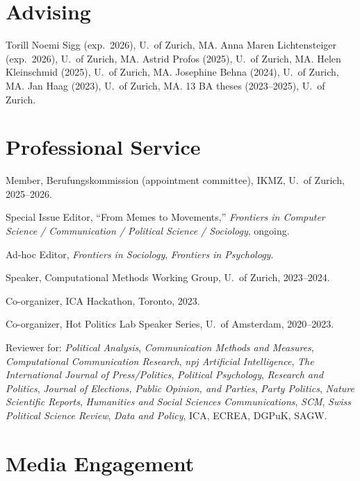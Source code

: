 \documentclass[11pt,a4paper]{article}
\begin{document}
\section{Advising}

Torill Noemi Sigg (exp.\ 2026), U.\ of Zurich, MA.
Anna Maren Lichtensteiger (exp.\ 2026), U.\ of Zurich, MA.
Astrid Profos (2025), U.\ of Zurich, MA.
Helen Kleinschmid (2025), U.\ of Zurich, MA.
Josephine Behna (2024), U.\ of Zurich, MA.
Jan Haag (2023), U.\ of Zurich, MA.
13 BA theses (2023--2025), U.\ of Zurich.


\section{Professional Service}

Member, Berufungskommission (appointment committee), IKMZ, U.\ of Zurich, 2025--2026.

Special Issue Editor, ``From Memes to Movements,'' \textit{Frontiers in Computer Science / Communication / Political Science / Sociology}, ongoing.

Ad-hoc Editor, \textit{Frontiers in Sociology}, \textit{Frontiers in Psychology}.

Speaker, Computational Methods Working Group, U.\ of Zurich, 2023--2024.

Co-organizer, ICA Hackathon, Toronto, 2023.

Co-organizer, Hot Politics Lab Speaker Series, U.\ of Amsterdam, 2020--2023.

Reviewer for: \textit{Political Analysis}, \textit{Communication Methods and Measures}, \textit{Computational Communication Research}, \textit{npj Artificial Intelligence}, \textit{The International Journal of Press/Politics}, \textit{Political Psychology}, \textit{Research and Politics}, \textit{Journal of Elections, Public Opinion, and Parties}, \textit{Party Politics}, \textit{Nature Scientific Reports}, \textit{Humanities and Social Sciences Communications}, \textit{SCM}, \textit{Swiss Political Science Review}, \textit{Data and Policy}, ICA, ECREA, DGPuK, SAGW.


\section{Media Engagement}
\end{document}
